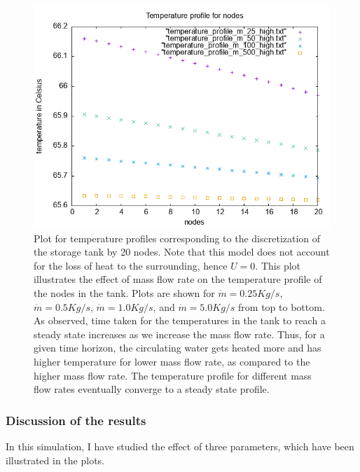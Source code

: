\documentclass{article}
\begin{document}
\begin{figure}[ht]
\centering
\includegraphics{figures/temperature_profile_m_dot.png}
\caption{Plot for temperature profiles corresponding to the discretization of the storage tank by 20 nodes. Note that this model does not account for the loss of heat to the surrounding, hence $U = 0$. This plot illustrates the effect of mass flow rate on the temperature profile of the nodes in the tank.  Plots are shown for $\dot{m} = 0.25 Kg/s$, $\dot{m} = 0.5 Kg/s$, $\dot{m} = 1.0 Kg/s$, and $\dot{m} = 5.0 Kg/s$ from top to bottom. As observed, time taken for the temperatures in the tank to reach a steady state increases as we increase the mass flow rate.  Thus, for a given time horizon, the circulating water gets heated more and has higher temperature for lower mass flow rate, as compared to the higher mass flow rate. The temperature profile for different mass flow rates eventually converge to a steady state profile.  }
\end{figure}

\newpage
\subsubsection*{Discussion of the results}
In this simulation, I have studied the effect of three parameters, which have been illustrated in the plots.
\end{document}

